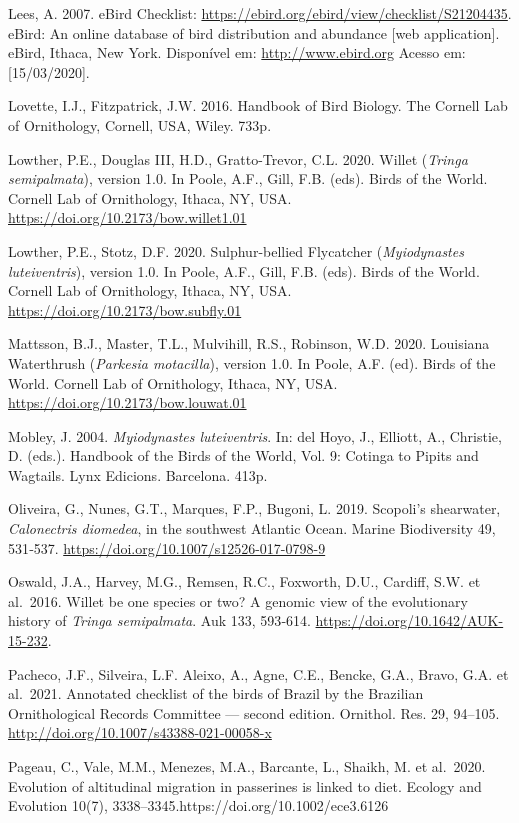 \documentclass[
  oneside]{scrbook}
\begin{document}
Lees, A. 2007. eBird Checklist: \url{https://ebird.org/ebird/view/checklist/S21204435}. eBird: An online database of bird distribution and abundance {[}web application{]}. eBird, Ithaca, New York. Disponível em: \url{http://www.ebird.org} Acesso em: {[}15/03/2020{]}.

Lovette, I.J., Fitzpatrick, J.W. 2016. Handbook of Bird Biology. The Cornell Lab of Ornithology, Cornell, USA, Wiley. 733p.

Lowther, P.E., Douglas III, H.D., Gratto-Trevor, C.L. 2020. Willet (\emph{Tringa semipalmata}), version 1.0. In Poole, A.F., Gill, F.B. (eds). Birds of the World. Cornell Lab of Ornithology, Ithaca, NY, USA. \url{https://doi.org/10.2173/bow.willet1.01}

Lowther, P.E., Stotz, D.F. 2020. Sulphur-bellied Flycatcher (\emph{Myiodynastes luteiventris}), version 1.0. In Poole, A.F., Gill, F.B. (eds). Birds of the World. Cornell Lab of Ornithology, Ithaca, NY, USA. \url{https://doi.org/10.2173/bow.subfly.01}

Mattsson, B.J., Master, T.L., Mulvihill, R.S., Robinson, W.D. 2020. Louisiana Waterthrush (\emph{Parkesia motacilla}), version 1.0. In Poole, A.F. (ed). Birds of the World. Cornell Lab of Ornithology, Ithaca, NY, USA. \url{https://doi.org/10.2173/bow.louwat.01}

Mobley, J. 2004. \emph{Myiodynastes luteiventris}. In: del Hoyo, J., Elliott, A., Christie, D. (eds.). Handbook of the Birds of the World, Vol. 9: Cotinga to Pipits and Wagtails. Lynx Edicions. Barcelona. 413p.

Oliveira, G., Nunes, G.T., Marques, F.P., Bugoni, L. 2019. Scopoli's shearwater, \emph{Calonectris diomedea}, in the southwest Atlantic Ocean. Marine Biodiversity 49, 531‑537. \url{https://doi.org/10.1007/s12526-017-0798-9}

Oswald, J.A., Harvey, M.G., Remsen, R.C., Foxworth, D.U., Cardiff, S.W. et al.~2016. Willet be one species or two? A genomic view of the evolutionary history of \emph{Tringa semipalmata}. Auk 133, 593‑614. \url{https://doi.org/10.1642/AUK-15-232}.

Pacheco, J.F., Silveira, L.F. Aleixo, A., Agne, C.E., Bencke, G.A., Bravo, G.A. et al.~2021. Annotated checklist of the birds of Brazil by the Brazilian Ornithological Records Committee --- second edition. Ornithol. Res. 29, 94--105. \url{http://doi.org/10.1007/s43388-021-00058-x}

Pageau, C., Vale, M.M., Menezes, M.A., Barcante, L., Shaikh, M. et al.~2020. Evolution of altitudinal migration in passerines is linked to diet. Ecology and Evolution 10(7), 3338--3345.https://doi.org/10.1002/ece3.6126
\end{document}
